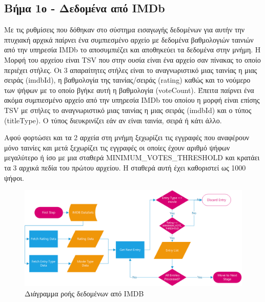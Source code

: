 \subsection{Βήμα 1ο - Δεδομένα από IMDb}
Με τις ρυθμίσεις που δόθηκαν στο σύστημα εισαγωγής δεδομένων για αυτήν την πτυχιακή αρχικά παίρνει ένα συμπιεσμένο αρχείο με δεδομένα βαθμολογιών ταινιών από την υπηρεσία IMDb το αποσυμπιέζει και αποθηκεύει τα δεδομένα στην μνήμη. Η Μορφή του αρχείου είναι TSV που στην ουσία είναι ένα αρχείο σαν πίνακας το οποίο περιέχει στήλες. Οι 3 απαραίτητες στήλες είναι το αναγνωριστικό μιας ταινίας η μιας σειράς (imdbId), η βαθμολογία της ταινίας/σειράς (rating) καθώς και το νούμερο των ψήφων με το οποίο βγήκε αυτή η βαθμολογία (voteCount). Έπειτα παίρνει ένα ακόμα συμπιεσμένο αρχείο από την υπηρεσία IMDb του οποίου η μορφή είναι επίσης TSV με στήλες το αναγνωριστικό μιας ταινίας η μιας σειράς (imdbId) και ο τύπος (titleType). Ο τύπος διευκρινίζει εάν αν είναι ταινία, σειρά ή κάτι άλλο. 

Αφού φορτώσει και τα 2 αρχεία στη μνήμη ξεχωρίζει τις εγγραφές που αναφέρουν μόνο ταινίες και μετά ξεχωρίζει τις εγγραφές οι οποίες έχουν αριθμό ψήφων μεγαλύτερο ή ίσο με μια σταθερά MINIMUM\_VOTES\_THRESHOLD και κρατάει τα 3 αρχικά πεδία του πρώτου αρχείου. Η σταθερά αυτή έχει καθοριστεί ως 1000 ψήφοι.


\begin{figure}[h]
  \centering
  \includegraphics[width=150mm]{Chapters/5 - Architecture/Import/Images/imdb_flowchart.png}
  \caption{Διάγραμμα ροής δεδομένων από IMDB}
  \label{flowchart:imdbImport}
\end{figure}